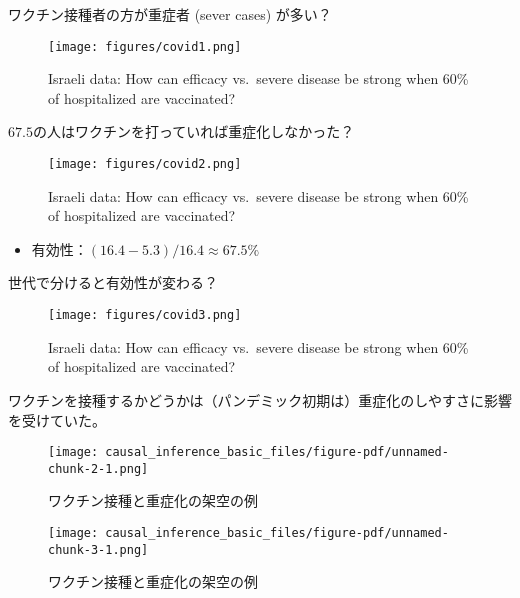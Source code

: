 \documentclass[
  xelatex,
  ja=standard]{bxjsarticle}
\providecommand{\tightlist}{%
  \setlength{\itemsep}{0pt}\setlength{\parskip}{0pt}}\usepackage{longtable,booktabs,array}
\begin{document}
ワクチン接種者の方が重症者 (sever cases) が多い？

\begin{figure}[htpb]

{\centering \texttt{[image: figures/covid1.png]}

}

\caption{Israeli data: How can efficacy vs.~severe disease be strong
when 60\% of hospitalized are vaccinated?}

\end{figure}

\(67.5%
\)の人はワクチンを打っていれば重症化しなかった？

\begin{figure}[htpb]

{\centering \texttt{[image: figures/covid2.png]}

}

\caption{Israeli data: How can efficacy vs.~severe disease be strong
when 60\% of hospitalized are vaccinated?}

\end{figure}

\begin{itemize}
\tightlist
\item
  有効性：\((16.4 - 5.3)/16.4 \approx 67.5\%\)
\end{itemize}

世代で分けると有効性が変わる？

\begin{figure}[htpb]

{\centering \texttt{[image: figures/covid3.png]}

}

\caption{Israeli data: How can efficacy vs.~severe disease be strong
when 60\% of hospitalized are vaccinated?}

\end{figure}

ワクチンを接種するかどうかは（パンデミック初期は）重症化のしやすさに影響を受けていた。

\begin{figure}[htpb]

{\centering \texttt{[image: causal\_inference\_basic\_files/figure-pdf/unnamed-chunk-2-1.png]}

}

\caption{ワクチン接種と重症化の架空の例}

\end{figure}

\begin{figure}[htpb]

{\centering \texttt{[image: causal\_inference\_basic\_files/figure-pdf/unnamed-chunk-3-1.png]}

}

\caption{ワクチン接種と重症化の架空の例}

\end{figure}
\end{document}

